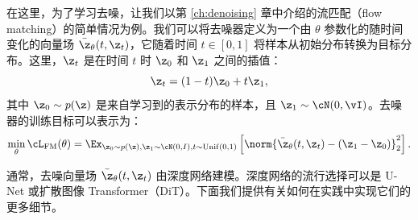 \documentclass[../../book-main_zh.tex]{subfiles}
\begin{document}
在这里，为了学习去噪，让我们以第 \ref{ch:denoising} 章中介绍的流匹配（flow matching）的简单情况为例。我们可以将去噪器定义为一个由 $\theta$ 参数化的随时间变化的向量场 $\bar{\z}_{\theta}(t,
\z_t)$，它随着时间 $t \in [0,
1]$ 将样本从初始分布转换为目标分布。这里，$\z_t$ 是在时间 $t$ 时 $\z_0$ 和 $\z_1$ 之间的插值：
\begin{equation}
\z_t = (1 - t)\z_0 + t\z_1,
\end{equation}
其中 $\z_0 \sim p(\z)$ 是来自学习到的表示分布的样本，且 $\z_1 \sim \cN(0, \vI)$。去噪器的训练目标可以表示为：
\begin{equation}
\min_{\theta} \cL_{\mathrm{FM}}(\theta) = \Ex_{\z_0 \sim p(\z), \z_1
\sim \cN(0, I), t \sim \mathrm{Unif}(0, 1)} \left[
\norm{\bar{\z}_{\theta}(t,\z_t) - (\z_1 - \z_0)}_2^2 \right].
\end{equation}

通常，去噪向量场 $\bar{\z}_{\theta}(t,
\z_t)$ 由深度网络建模。深度网络的流行选择可以是 U-Net 或扩散图像 Transformer（DiT）。下面我们提供有关如何在实践中实现它们的更多细节。





\end{document}
